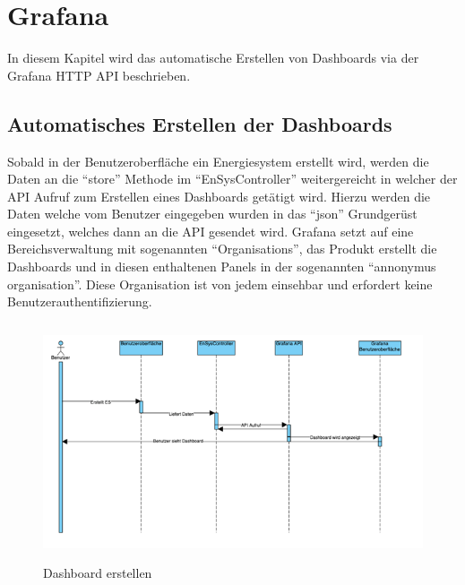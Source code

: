 \newpage
\section{Grafana}
In diesem Kapitel wird das automatische Erstellen von Dashboards via der Grafana HTTP API beschrieben. 

\subsection{Automatisches Erstellen der Dashboards} \label{sec: Dashboard}
Sobald in der Benutzeroberfläche ein Energiesystem erstellt wird, werden die Daten an die “store” Methode im “EnSysController” weitergereicht in welcher der API Aufruf zum Erstellen eines Dashboards getätigt wird. Hierzu werden die Daten welche vom Benutzer eingegeben wurden in das “json” Grundgerüst eingesetzt, welches dann an die API gesendet wird. Grafana setzt auf eine Bereichsverwaltung mit sogenannten “Organisations”, das Produkt erstellt die Dashboards und in diesen enthaltenen Panels in der sogenannten “annonymus organisation”. Diese Organisation ist von jedem einsehbar und erfordert keine Benutzerauthentifizierung. 
\begin{figure}[h]
	\centering
	\includegraphics[height=7cm,width=14cm]{images/DashboardErstellen}
	\caption{Dashboard erstellen}
	\label{fig:DashboardErstellen }
\end{figure}


